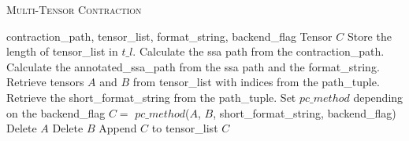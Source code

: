 \begin{algorithm}[H]
    \caption{\textsc{Multi-Tensor Contraction}}
    \label{alg:mtc}
    \begin{algorithmic}[1]
        \REQUIRE  contraction\_path,  tensor\_list, format\_string, backend\_flag 
        \ENSURE Tensor $C$
        \STATE Store the length of tensor\_list in   $t\_l$.
        \STATE Calculate the ssa path from the contraction\_path.
        \STATE Calculate the annotated\_ssa\_path from the ssa path and the format\_string. 
        \STATE Retrieve tensors $A$ and $B$ from tensor\_list with indices from the path\_tuple.
        \STATE  Retrieve the short\_format\_string from the path\_tuple.
        \STATE Set $pc\_method$ depending on the backend\_flag 
        \STATE  $C =$ $pc\_method$($A$, $B$, short\_format\_string, backend\_flag) 
        \STATE Delete $ A$ 
        \ENDIF
        \STATE Delete $ B$ 
        \ENDIF
        \STATE Append $ C $ to tensor\_list 
        \ENDFOR
        \RETURN  $C$ 
    \end{algorithmic}
\end{algorithm}
